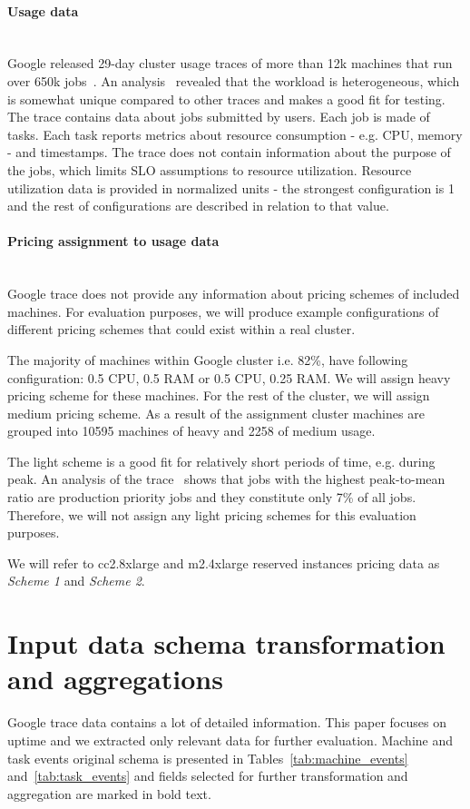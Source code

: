 \documentclass[]{final_report}
\newcommand{\myparagraph}[1]{\paragraph{#1}\mbox{}\\}
\begin{document}
\myparagraph{Usage data}

Google released 29-day cluster usage traces of more than 12k machines that run over 650k jobs~\cite{clusterdata:Reiss2011}. An analysis~\cite{clusterdata:Reiss2012b} revealed that the workload is heterogeneous, which is somewhat unique compared to other traces and makes a good fit for testing.
The trace contains data about jobs submitted by users. Each job is made of tasks. Each task reports metrics about resource consumption - e.g. CPU, memory - and timestamps. The trace does not contain information about the purpose of the jobs, which limits SLO assumptions to resource utilization. 
Resource utilization data is provided in normalized units - the strongest configuration is 1 and the rest of configurations are described in relation to that value.

\myparagraph{Pricing assignment to usage data}

Google trace does not provide any information about pricing schemes of included machines. For evaluation purposes, we will produce example configurations of different pricing schemes that could exist within a real cluster. 

The majority of machines within Google cluster i.e. 82\%, have following configuration: 0.5 CPU, 0.5 RAM or 0.5 CPU, 0.25 RAM. We will assign heavy pricing scheme for these machines. For the rest of the cluster, we will assign medium pricing scheme. 
As a result of the assignment cluster machines are grouped into 10595 machines of heavy and 2258 of medium usage.

The light scheme is a good fit for relatively short periods of time, e.g. during peak. An analysis of the trace~\cite{clusterdata:Reiss2012b} shows that jobs with the highest peak-to-mean ratio are production priority jobs and they constitute only 7\% of all jobs. Therefore, we will not assign any light pricing schemes for this evaluation purposes. 

We will refer to cc2.8xlarge and m2.4xlarge reserved instances pricing data as \textit{Scheme 1} and \textit{Scheme 2}.  
 

\section{Input data schema transformation and aggregations}

Google trace data contains a lot of detailed information. This paper focuses on uptime and we extracted only relevant data for further evaluation. Machine and task events original schema is presented in Tables~\ref{tab:machine_events} and~\ref{tab:task_events} and fields selected for further transformation and aggregation are marked in bold text. 
\end{document}

